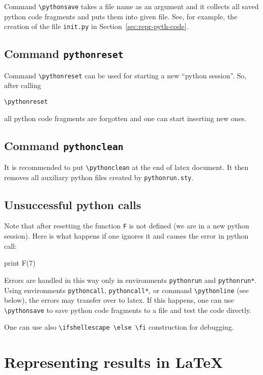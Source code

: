 \documentclass[a4paper,12pt]{article}
\newcommand{\bs}{\symbol{`\\}}
\begin{document}
Command \verb+\pythonsave+ takes a file name as an argument and it
collects all saved python code fragments and puts them into given
file. See, for example, the creation of the file \verb+init.py+ in
Section~\ref{sec:repr-pyth-code}.

\subsection{Command \texttt{\bs pythonreset}}

Command \verb+\pythonreset+ can be used for starting a new ``python
session''. So, after calling
\begin{verbatim}
\pythonreset
\end{verbatim}
all python code fragments are forgotten and one can start inserting
new ones.
\pythonreset

\subsection{Command \texttt{\bs pythonclean}}

It is recommended to put \verb+\pythonclean+ at the end of latex
document. It then removes all auxiliary python files created by
\verb+pythonrun.sty+.

\subsection{Unsuccessful python calls}

Note that after resetting the function \verb+F+ is not defined (we are
in a new python session). Here is what happens if one ignores it and
causes the error in python call:
\begin{pythonrun}
print F(7)
\end{pythonrun}
Errors are handled in this way only in environments \verb+pythonrun+
and \verb+pythonrun*+. Using environments \verb+pythoncall+,
\verb+pythoncall*+, or command \verb+\pythonline+ (see below), the
errors may transfer over to latex. If this happens, one can use
\verb+\pythonsave+ to save python code fragments to a file and test the
code directly.

One can use also \verb+\ifshellescape \else \fi+ construction for
debugging. 

\section{Representing results in LaTeX}
\end{document}
